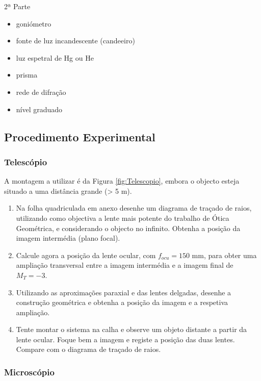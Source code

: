 \documentclass[a4paper,12pt]{article}      %
\begin{document}
2ª Parte
\begin{itemize}
\item goniómetro
\item fonte de luz incandescente (candeeiro)
\item luz espetral de Hg ou He
\item prisma
\item rede de difração
\item nível graduado
\end{itemize}

\subsection{\sf Procedimento Experimental}

\subsubsection{\sf  Telescópio}

A montagem  a utilizar é da Figura \ref{fig:Telescopio}, embora o objecto esteja situado a uma distância grande (> 5 m). 

\begin{enumerate}
\item Na folha quadriculada em anexo desenhe um diagrama de traçado de raios, utilizando como objectiva a lente mais potente do trabalho de Ótica Geométrica, e considerando o objecto no infinito. Obtenha a posição da imagem intermédia (plano focal). 
\item Calcule agora a posição da lente ocular, com $f_{ocu}=150$ mm, para obter uma ampliação transversal entre a imagem intermédia e a imagem final de $M_T=-3$. 
\item Utilizando as aproximações paraxial e das lentes delgadas, desenhe a construção geométrica e obtenha a posição da imagem e a respetiva ampliação.
\item Tente montar o sistema na calha e observe um objeto distante a partir da lente ocular. Foque bem a imagem e registe a posição das duas lentes. Compare com o diagrama de traçado de raios.
\end{enumerate}

\subsubsection{\sf  Microscópio}
\end{document}
